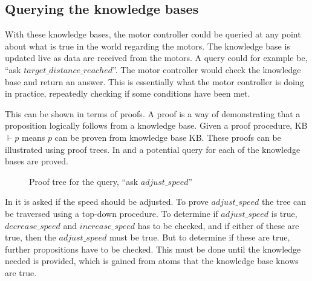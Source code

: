 \subsection{Querying the knowledge bases}
With these knowledge bases, the motor controller could be queried at any point about what is true in the world regarding the motors. The knowledge base is updated live as data are received from the motors. A query could for example be, ``ask $target\_distance\_reached$''. The motor controller would check the knowledge base and return an answer. This is essentially what the motor controller is doing in practice, repeatedly checking if some conditions have been met.

This can be shown in terms of proofs. A proof is a way of demonstrating that a proposition logically follows from a knowledge base. Given a proof procedure, KB $\vdash p$ means $p$ can be proven from knowledge base KB. These proofs can be illustrated using proof trees. In  and  a potential query for each of the knowledge bases are proved.
\begin{figure}[H]
     \caption{\label{fig:speed-tree} Proof tree for the query, ``ask $adjust\_speed$''}
\end{figure}
In  it is asked if the speed should be adjusted. To prove $adjust\_speed$ the tree can be traversed using a top-down procedure. To determine if $adjust\_speed$ is true, $decrease\_speed$ and $increase\_speed$ has to be checked, and if either of these are true, then the $adjust\_speed$ must be true. But to determine if these are true, further propositions have to be checked. This must be done until the knowledge needed is provided, which is gained from atoms that the knowledge base knows are true.

